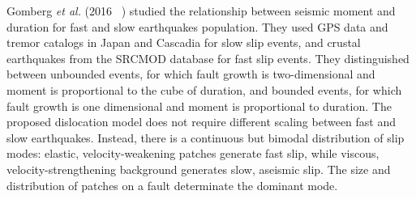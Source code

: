 \documentclass[main.tex]{subfiles}
\begin{document}
Gomberg \textit{et al.} (2016 ~\cite{GOM_2016_GRL}) studied the relationship between seismic moment and duration for fast and slow earthquakes population. They used GPS data and tremor catalogs in Japan and Cascadia for slow slip events, and crustal earthquakes from the SRCMOD database for fast slip events. They distinguished between unbounded events, for which fault growth is two-dimensional and moment is proportional to the cube of duration, and bounded events, for which fault growth is one dimensional and moment is proportional to duration. The proposed dislocation model does not require different scaling between fast and slow earthquakes. Instead, there is a continuous but bimodal distribution of slip modes: elastic, velocity-weakening patches generate fast slip, while viscous, velocity-strengthening background generates slow, aseismic slip. The size and distribution of patches on a fault determinate the dominant mode.
\end{document}
